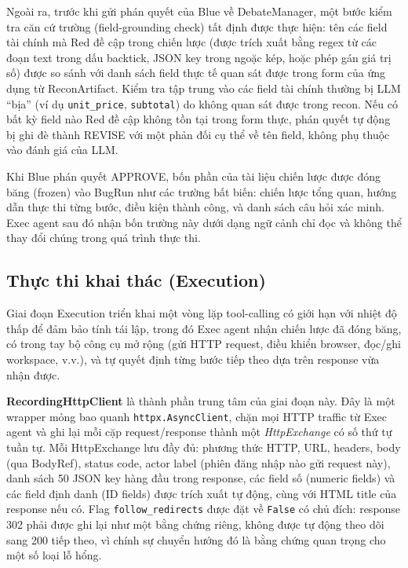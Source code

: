 Ngoài ra, trước khi gửi phán quyết của Blue về DebateManager, một bước kiểm tra căn cứ trường (field-grounding check) tất định được thực hiện: tên các field tài chính mà Red đề cập trong chiến lược (được trích xuất bằng regex từ các đoạn text trong dấu backtick, JSON key trong ngoặc kép, hoặc phép gán giá trị số) được so sánh với danh sách field thực tế quan sát được trong form của ứng dụng từ ReconArtifact. Kiểm tra tập trung vào các field tài chính thường bị LLM ``bịa'' (ví dụ \texttt{unit\_price}, \texttt{subtotal}) do không quan sát được trong recon. Nếu có bất kỳ field nào Red đề cập không tồn tại trong form thực, phán quyết tự động bị ghi đè thành REVISE với một phản đối cụ thể về tên field, không phụ thuộc vào đánh giá của LLM.

Khi Blue phán quyết APPROVE, bốn phần của tài liệu chiến lược được đóng băng (frozen) vào BugRun như các trường bất biến: chiến lược tổng quan, hướng dẫn thực thi từng bước, điều kiện thành công, và danh sách câu hỏi xác minh. Exec agent sau đó nhận bốn trường này dưới dạng ngữ cảnh chỉ đọc và không thể thay đổi chúng trong quá trình thực thi.

\subsection{Thực thi khai thác (Execution)}

Giai đoạn Execution triển khai một vòng lặp tool-calling có giới hạn với nhiệt độ thấp để đảm bảo tính tái lập, trong đó Exec agent nhận chiến lược đã đóng băng, có trong tay bộ công cụ mở rộng (gửi HTTP request, điều khiển browser, đọc/ghi workspace, v.v.), và tự quyết định từng bước tiếp theo dựa trên response vừa nhận được.

\textbf{RecordingHttpClient} là thành phần trung tâm của giai đoạn này. Đây là một wrapper mỏng bao quanh \texttt{httpx.AsyncClient}, chặn mọi HTTP traffic từ Exec agent và ghi lại mỗi cặp request/response thành một \textit{HttpExchange} có số thứ tự tuần tự. Mỗi HttpExchange lưu đầy đủ: phương thức HTTP, URL, headers, body (qua BodyRef), status code, actor label (phiên đăng nhập nào gửi request này), danh sách 50 JSON key hàng đầu trong response, các field số (numeric fields) và các field định danh (ID fields) được trích xuất tự động, cùng với HTML title của response nếu có. Flag \texttt{follow\_redirects} được đặt về \texttt{False} có chủ đích: response 302 phải được ghi lại như một bằng chứng riêng, không được tự động theo dõi sang 200 tiếp theo, vì chính sự chuyển hướng đó là bằng chứng quan trọng cho một số loại lỗ hổng.

